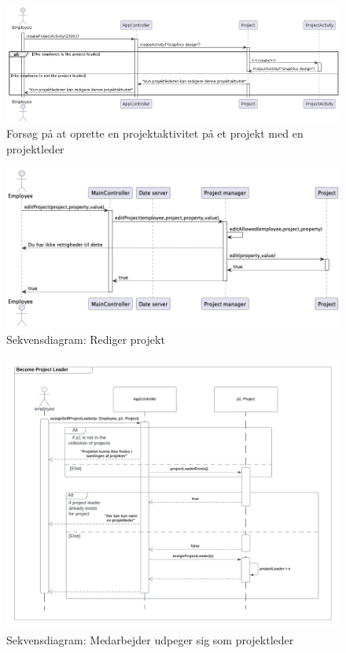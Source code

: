 \begin{figure}[H]
    \centering
    \caption{Forsøg på at oprette en projektaktivitet på et projekt med en projektleder}\label{fig:sequence_create_PA_PL}
    \includegraphics[width = .95\textwidth]{Diagrams/createActivityPL.png}
\end{figure}
\begin{figure}[H]
    \centering
    \caption{Sekvensdiagram: Rediger projekt}\label{fig:sequence_project_edit}
    \includegraphics[width = .75\textwidth]{Diagrams/seq_project_edit.png}
\end{figure}
\begin{figure}[H]
    \centering
    \caption{Sekvensdiagram: Medarbejder udpeger sig som projektleder}\label{fig:becomeProjectLeader}
    \includegraphics[width = 1\textwidth]{Diagrams/Become Project Leader.png}
\end{figure}
\newpage
